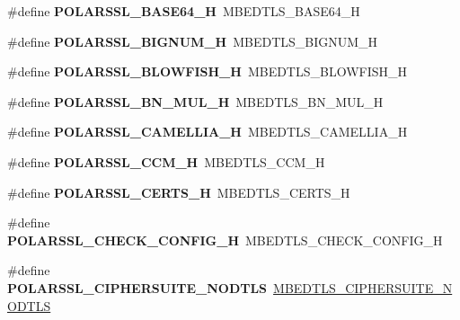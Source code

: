 \begin{DoxyCompactItemize}
\#define {\bfseries P\+O\+L\+A\+R\+S\+S\+L\+\_\+\+B\+A\+S\+E64\+\_\+H}~M\+B\+E\+D\+T\+L\+S\+\_\+\+B\+A\+S\+E64\+\_\+H
\item 
\mbox{\label{compat-1_83_8h_ae38cf0588c907362f273873868ea188b}} 
\#define {\bfseries P\+O\+L\+A\+R\+S\+S\+L\+\_\+\+B\+I\+G\+N\+U\+M\+\_\+H}~M\+B\+E\+D\+T\+L\+S\+\_\+\+B\+I\+G\+N\+U\+M\+\_\+H
\item 
\mbox{\label{compat-1_83_8h_aa9b72f11cc690354bd7f5a07bd25e715}} 
\#define {\bfseries P\+O\+L\+A\+R\+S\+S\+L\+\_\+\+B\+L\+O\+W\+F\+I\+S\+H\+\_\+H}~M\+B\+E\+D\+T\+L\+S\+\_\+\+B\+L\+O\+W\+F\+I\+S\+H\+\_\+H
\item 
\mbox{\label{compat-1_83_8h_a6a1b84a13e14f6c1bc294fc8a45a216e}} 
\#define {\bfseries P\+O\+L\+A\+R\+S\+S\+L\+\_\+\+B\+N\+\_\+\+M\+U\+L\+\_\+H}~M\+B\+E\+D\+T\+L\+S\+\_\+\+B\+N\+\_\+\+M\+U\+L\+\_\+H
\item 
\mbox{\label{compat-1_83_8h_ab547d35267ea1dfdc323e85d0ba24c1c}} 
\#define {\bfseries P\+O\+L\+A\+R\+S\+S\+L\+\_\+\+C\+A\+M\+E\+L\+L\+I\+A\+\_\+H}~M\+B\+E\+D\+T\+L\+S\+\_\+\+C\+A\+M\+E\+L\+L\+I\+A\+\_\+H
\item 
\mbox{\label{compat-1_83_8h_ae23c797b950ad08ddbc9a6461c34b01d}} 
\#define {\bfseries P\+O\+L\+A\+R\+S\+S\+L\+\_\+\+C\+C\+M\+\_\+H}~M\+B\+E\+D\+T\+L\+S\+\_\+\+C\+C\+M\+\_\+H
\item 
\mbox{\label{compat-1_83_8h_a3bbc165b85d9cea741d09150e418973d}} 
\#define {\bfseries P\+O\+L\+A\+R\+S\+S\+L\+\_\+\+C\+E\+R\+T\+S\+\_\+H}~M\+B\+E\+D\+T\+L\+S\+\_\+\+C\+E\+R\+T\+S\+\_\+H
\item 
\mbox{\label{compat-1_83_8h_a35f628e4b8869450e4a8816dced3785f}} 
\#define {\bfseries P\+O\+L\+A\+R\+S\+S\+L\+\_\+\+C\+H\+E\+C\+K\+\_\+\+C\+O\+N\+F\+I\+G\+\_\+H}~M\+B\+E\+D\+T\+L\+S\+\_\+\+C\+H\+E\+C\+K\+\_\+\+C\+O\+N\+F\+I\+G\+\_\+H
\item 
\mbox{\label{compat-1_83_8h_a0fef789a1c5fb544a4d5b3b5eb521beb}} 
\#define {\bfseries P\+O\+L\+A\+R\+S\+S\+L\+\_\+\+C\+I\+P\+H\+E\+R\+S\+U\+I\+T\+E\+\_\+\+N\+O\+D\+T\+LS}~\mbox{\hyperlink{ssl__ciphersuites_8h_a9b28a41a6dc8566ed93e1d534572785f}{M\+B\+E\+D\+T\+L\+S\+\_\+\+C\+I\+P\+H\+E\+R\+S\+U\+I\+T\+E\+\_\+\+N\+O\+D\+T\+LS}}

\end{DoxyCompactItemize}
